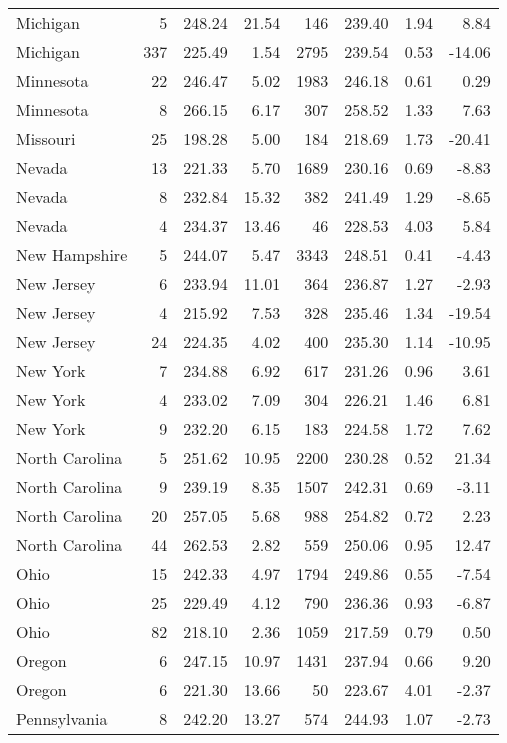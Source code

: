 \begin{longtable}{lrrr@{\extracolsep{10pt}}rrrr}
  Michigan &   5 & 248.24 & 21.54 & 146 & 239.40 & 1.94 & 8.84 \\ 
  Michigan & 337 & 225.49 & 1.54 & 2795 & 239.54 & 0.53 & -14.06 \\ 
  Minnesota &  22 & 246.47 & 5.02 & 1983 & 246.18 & 0.61 & 0.29 \\ 
  Minnesota &   8 & 266.15 & 6.17 & 307 & 258.52 & 1.33 & 7.63 \\ 
  Missouri &  25 & 198.28 & 5.00 & 184 & 218.69 & 1.73 & -20.41 \\ 
  Nevada &  13 & 221.33 & 5.70 & 1689 & 230.16 & 0.69 & -8.83 \\ 
  Nevada &   8 & 232.84 & 15.32 & 382 & 241.49 & 1.29 & -8.65 \\ 
  Nevada &   4 & 234.37 & 13.46 &  46 & 228.53 & 4.03 & 5.84 \\ 
  New Hampshire &   5 & 244.07 & 5.47 & 3343 & 248.51 & 0.41 & -4.43 \\ 
  New Jersey &   6 & 233.94 & 11.01 & 364 & 236.87 & 1.27 & -2.93 \\ 
  New Jersey &   4 & 215.92 & 7.53 & 328 & 235.46 & 1.34 & -19.54 \\ 
  New Jersey &  24 & 224.35 & 4.02 & 400 & 235.30 & 1.14 & -10.95 \\ 
  New York &   7 & 234.88 & 6.92 & 617 & 231.26 & 0.96 & 3.61 \\ 
  New York &   4 & 233.02 & 7.09 & 304 & 226.21 & 1.46 & 6.81 \\ 
  New York &   9 & 232.20 & 6.15 & 183 & 224.58 & 1.72 & 7.62 \\ 
  North Carolina &   5 & 251.62 & 10.95 & 2200 & 230.28 & 0.52 & 21.34 \\ 
  North Carolina &   9 & 239.19 & 8.35 & 1507 & 242.31 & 0.69 & -3.11 \\ 
  North Carolina &  20 & 257.05 & 5.68 & 988 & 254.82 & 0.72 & 2.23 \\ 
  North Carolina &  44 & 262.53 & 2.82 & 559 & 250.06 & 0.95 & 12.47 \\ 
  Ohio &  15 & 242.33 & 4.97 & 1794 & 249.86 & 0.55 & -7.54 \\ 
  Ohio &  25 & 229.49 & 4.12 & 790 & 236.36 & 0.93 & -6.87 \\ 
  Ohio &  82 & 218.10 & 2.36 & 1059 & 217.59 & 0.79 & 0.50 \\ 
  Oregon &   6 & 247.15 & 10.97 & 1431 & 237.94 & 0.66 & 9.20 \\ 
  Oregon &   6 & 221.30 & 13.66 &  50 & 223.67 & 4.01 & -2.37 \\ 
  Pennsylvania &   8 & 242.20 & 13.27 & 574 & 244.93 & 1.07 & -2.73 \\ 

\end{longtable}
